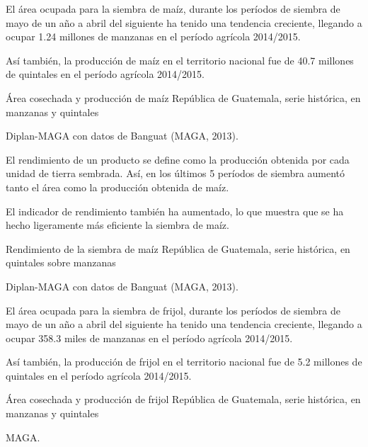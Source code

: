 
{%
El área ocupada para la siembra de maíz, durante los períodos de siembra de mayo de un año a abril del siguiente ha tenido una tendencia creciente, llegando a ocupar 1.24 millones de  manzanas en el período agrícola 2014/2015.

Así también, la producción de maíz en el territorio nacional fue de 40.7 millones de quintales en el período agrícola 2014/2015.
}%
{%
 Área cosechada y producción de maíz} %
{%
 República de Guatemala, serie histórica, en manzanas y  quintales } %
{%
 \begin{tikzpicture}[x=1pt,y=1pt]    \end{tikzpicture}}%
{%
Diplan-MAGA con datos de Banguat (MAGA, 2013).} %



%
{%
El rendimiento de un producto se define como la producción obtenida por cada unidad de tierra sembrada. Así, en los últimos 5 períodos de siembra aumentó tanto el área como la producción obtenida de maíz.

 El indicador de rendimiento también ha aumentado, lo que muestra que se ha hecho ligeramente más eficiente la siembra de maíz. 
}%
{%
	Rendimiento de la siembra de maíz } %
{%
	República de Guatemala, serie histórica, en quintales sobre manzanas } %
{%
	\begin{tikzpicture}[x=1pt,y=1pt]    \end{tikzpicture}}%
{%
	Diplan-MAGA con datos de Banguat (MAGA, 2013).} %



%
{%
El área ocupada para la siembra de frijol, durante los períodos de siembra de mayo de un año a abril del siguiente ha tenido una tendencia creciente, llegando a ocupar 358.3 miles de  manzanas en el período agrícola 2014/2015.

Así también, la producción de frijol en el territorio nacional fue de 5.2 millones de quintales en el período agrícola 2014/2015.
}%
{%
	Área cosechada y producción de frijol} %
{%
	República de Guatemala, serie histórica, en manzanas y  quintales } %
{%
	\begin{tikzpicture}[x=1pt,y=1pt]    \end{tikzpicture}}%
{%
	MAGA.} %

